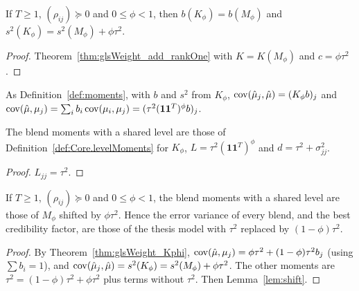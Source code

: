 \begin{theorem}\label{thm:glsWeight_Kphi}
  \leanok
  If $T \ge 1$, $(\rho_{ij}) \succeq 0$ and $0 \le \phi < 1$, then
  $b(K_\phi) = b(M_\phi)$ and $s^2(K_\phi) = s^2(M_\phi) + \phi\tau^2$.
\end{theorem}
\begin{proof}
  \leanok
  Theorem~\ref{thm:glsWeight_add_rankOne} with $K = K(M_\phi)$ and $c = \phi\tau^2$.
\end{proof}

\begin{definition}\label{def:momentsPhi}
  \leanok
  As Definition~\ref{def:moments}, with $b$ and $s^2$ from $K_\phi$,
  $\operatorname{cov}(\hat\mu_j,\hat\mu) = (K_\phi b)_j$ and
  $\operatorname{cov}(\hat\mu,\mu_j) = \sum_i b_i\operatorname{cov}(\mu_i,\mu_j)
    = (\tau^2(\mathbf 1\mathbf 1^T)^\phi b)_j$.
\end{definition}

\begin{lemma}\label{lem:momentsPhi_level}
  \leanok
  The blend moments with a shared level are those of
  Definition~\ref{def:Core.levelMoments} for $K_\phi$,
  $L = \tau^2(\mathbf 1\mathbf 1^T)^\phi$ and $d = \tau^2 + \sigma^2_{jj}$.
\end{lemma}
\begin{proof}
  \leanok
  $L_{jj} = \tau^2$.
\end{proof}

\begin{theorem}\label{thm:momentsPhi}
  \leanok
  If $T \ge 1$, $(\rho_{ij}) \succeq 0$ and $0 \le \phi < 1$, the blend moments
  with a shared level are those of $M_\phi$ shifted by $\phi\tau^2$. Hence the
  error variance of every blend, and the best credibility factor, are those of
  the thesis model with $\tau^2$ replaced by $(1-\phi)\tau^2$.
\end{theorem}
\begin{proof}
  \leanok
  By Theorem~\ref{thm:glsWeight_Kphi},
  $\operatorname{cov}(\hat\mu,\mu_j) = \phi\tau^2 + (1-\phi)\tau^2 b_j$ (using $\sum b_i = 1$), and
  $\operatorname{cov}(\hat\mu_j,\hat\mu) = s^2(K_\phi) = s^2(M_\phi) + \phi\tau^2$. The other moments
  are $\tau^2 = (1-\phi)\tau^2 + \phi\tau^2$ plus terms without $\tau^2$.
  Then Lemma~\ref{lem:shift}.
\end{proof}

